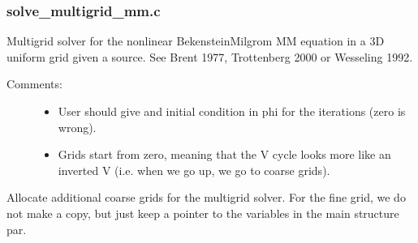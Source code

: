 \documentclass[letterpaper,10pt,english]{sphinxmanual}
\begin{document}
\begin{fulllineitems}
\label{\detokenize{sphinx-c-apidoc/output/gravity/mond_mass/initial_guess_mm_c:c.initial_guess_mm}}%
\pysigstartmultiline
{}%
\pysigstopmultiline
\end{fulllineitems}



\subsubsection{solve\_multigrid\_mm.c}
\label{\detokenize{sphinx-c-apidoc/output/gravity/mond_mass/solve_multigrid_mm_c:solve-multigrid-mm-c}}\label{\detokenize{sphinx-c-apidoc/output/gravity/mond_mass/solve_multigrid_mm_c::doc}}
Multigrid solver for the non\sphinxhyphen{}linear Bekenstein\sphinxhyphen{}Milgrom MM equation
in a 3D uniform grid given a source.
See Brent 1977, Trottenberg 2000 or Wesseling 1992.
\begin{description}
\item[{Comments:}] \leavevmode\begin{itemize}
\item {} 
User should give and initial condition in phi for the iterations
(zero is wrong).

\item {} 
Grids start from zero, meaning that the V cycle looks more like an
inverted V (i.e. when we go up, we go to coarse grids).

\end{itemize}

\end{description}

\begin{fulllineitems}
\label{\detokenize{sphinx-c-apidoc/output/gravity/mond_mass/solve_multigrid_mm_c:c.allocate_grids_mm}}%
\pysigstartmultiline
{}%
\pysigstopmultiline
Allocate additional coarse grids for the multigrid solver.
For the fine grid, we do not make a copy, but just keep a pointer
to the variables in the main structure par.

\end{fulllineitems}
\end{document}
